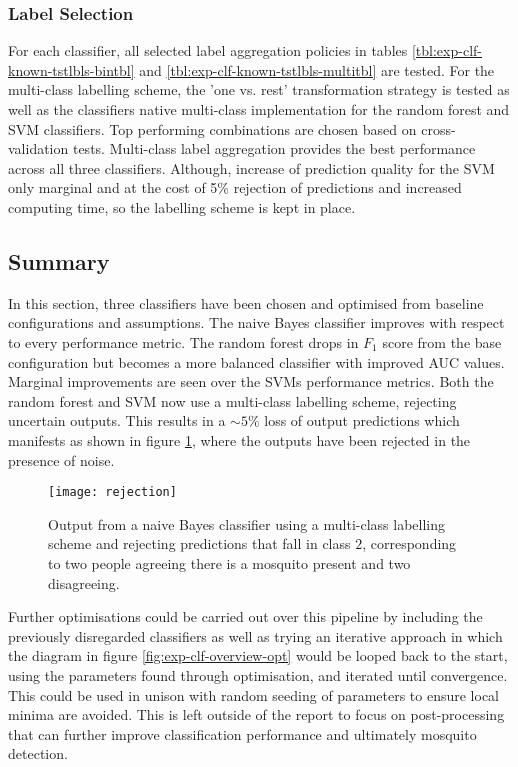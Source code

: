         \subsubsection{Label Selection}
        \label{subsubsec:exp-clf-opt-label}
            For each classifier, all selected label aggregation policies in tables \ref{tbl:exp-clf-known-tstlbls-bintbl} and \ref{tbl:exp-clf-known-tstlbls-multitbl} are tested. For the multi-class labelling scheme, the 'one vs. rest' transformation strategy is tested as well as the classifiers native multi-class implementation for the random forest and SVM classifiers. Top performing combinations are chosen based on cross-validation tests. Multi-class label aggregation provides the best performance across all three classifiers. Although, increase of prediction quality for the SVM only marginal and at the cost of 5\% rejection of predictions and increased computing time, so the  labelling scheme is kept in place.

    \subsection{Summary}
    \label{subsec:exp-clf-summary}
        In this section, three classifiers have been chosen and optimised from baseline configurations and assumptions. The naive Bayes classifier improves with respect to every performance metric. The random forest drops in $F_{1}$ score from the base configuration but becomes a more balanced classifier with improved AUC values. Marginal improvements are seen over the SVMs performance metrics. Both the random forest and SVM now use a multi-class labelling scheme, rejecting uncertain outputs. This results in a $\sim5\%$ loss of output predictions which manifests as shown in figure \ref{fig:exp-clf-summary-rej}, where the outputs have been rejected in the presence of noise.
        \begin{figure}[ht]
            \centering
            \texttt{[image: rejection]}
            \caption{Output from a naive Bayes classifier using a multi-class labelling scheme and rejecting predictions that fall in class $2$, corresponding to two people agreeing there is a mosquito present and two disagreeing.}
            \label{fig:exp-clf-summary-rej}
        \end{figure}
        Further optimisations could be carried out over this pipeline by including the previously disregarded classifiers as well as trying an iterative approach in which the diagram in figure \ref{fig:exp-clf-overview-opt} would be looped back to the start, using the parameters found through optimisation, and iterated until convergence. This could be used in unison with random seeding of parameters to ensure local minima are avoided. This is left outside of the report to focus on post-processing that can further improve classification performance and ultimately mosquito detection.